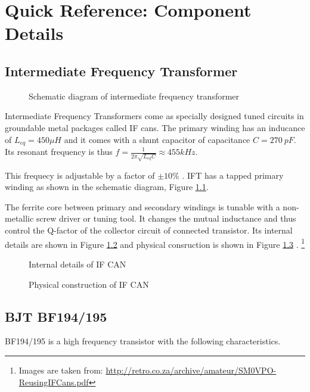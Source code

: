 \chapter {Quick Reference: Component Details}
\section{Intermediate Frequency Transformer}
\label{IFT}

\begin{figure}[ht]
\caption {Schematic diagram of intermediate frequency transformer}
\label{iftschem}
\end{figure}


Intermediate Frequency Transformers come as specially designed tuned circuits in groundable metal packages called IF cans. The primary winding has an inducance of $L_{eq}=450\mu H$ and it comes with a shunt capacitor of capacitance $C=270\ pF$. Its resonant frequency is thus $f=\frac{1}{2\pi\sqrt{L_{eq}C}}\approx 455 kHz$.

This frequecy is adjustable by a factor of $\pm 10 \%$ . IFT has a tapped primary winding as shown in the schematic diagram, Figure \ref{iftschem}. 

The ferrite core between primary and secondary windings is tunable with a non-metallic screw driver or tuning tool. It changes the mutual inductance and thus control the Q-factor of the collector circuit of connected transistor\cite{Tomasi}. Its internal details are shown in Figure \ref{ifcan2} and physical consruction is shown in Figure \ref{ifcan1} \cite{IFCAN}. \footnote{Images are taken from: \url{http://retro.co.za/archive/amateur/SM0VPO-ReusingIFCans.pdf}}

\begin{figure}
\caption {Internal details of IF CAN}

\label{ifcan2}
\end{figure}
\begin{figure}[ht]
\caption {Physical construction of IF CAN}
\label{ifcan1}
\end{figure}


\section{BJT BF194/195}
\label{BF194/195}
BF194/195 is a high frequency transistor with the following characteristics. \\

